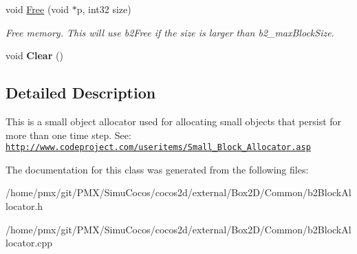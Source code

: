 \begin{DoxyCompactItemize}
\mbox{\label{classb2BlockAllocator_a945fdf86e260318b930a53dcc887ca8b}} 
void \hyperlink{classb2BlockAllocator_a945fdf86e260318b930a53dcc887ca8b}{Free} (void $\ast$p, int32 size)
\begin{DoxyCompactList}\small\item\em Free memory. This will use b2\+Free if the size is larger than b2\+\_\+max\+Block\+Size. \end{DoxyCompactList}\item 
\mbox{\label{classb2BlockAllocator_a3d3bac86217eba9d1eb6dff2acee0d77}} 
void {\bfseries Clear} ()
\end{DoxyCompactItemize}


\subsection{Detailed Description}
This is a small object allocator used for allocating small objects that persist for more than one time step. See\+: \href{http://www.codeproject.com/useritems/Small_Block_Allocator.asp}{\tt http\+://www.\+codeproject.\+com/useritems/\+Small\+\_\+\+Block\+\_\+\+Allocator.\+asp} 

The documentation for this class was generated from the following files\+:\begin{DoxyCompactItemize}
\item 
/home/pmx/git/\+P\+M\+X/\+Simu\+Cocos/cocos2d/external/\+Box2\+D/\+Common/b2\+Block\+Allocator.\+h\item 
/home/pmx/git/\+P\+M\+X/\+Simu\+Cocos/cocos2d/external/\+Box2\+D/\+Common/b2\+Block\+Allocator.\+cpp\end{DoxyCompactItemize}
